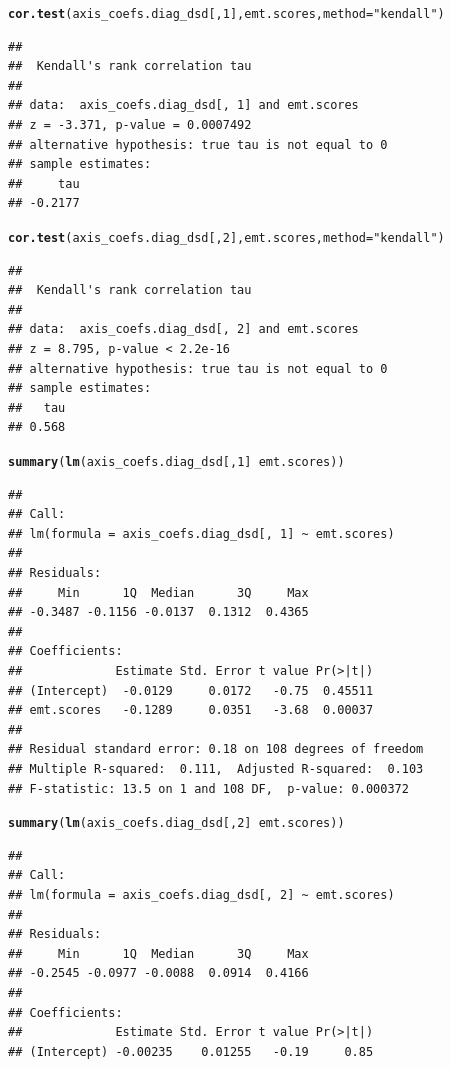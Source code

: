 \documentclass{article}\usepackage[]{graphicx}\usepackage[]{color}
\makeatletter
\newcommand{\hlnum}[1]{\textcolor[rgb]{0.686,0.059,0.569}{#1}}%
\newcommand{\hlstr}[1]{\textcolor[rgb]{0.192,0.494,0.8}{#1}}%
\newcommand{\hlopt}[1]{\textcolor[rgb]{0,0,0}{#1}}%
\newcommand{\hlstd}[1]{\textcolor[rgb]{0.345,0.345,0.345}{#1}}%
\newcommand{\hlkwc}[1]{\textcolor[rgb]{0.333,0.667,0.333}{#1}}%
\newcommand{\hlkwd}[1]{\textcolor[rgb]{0.737,0.353,0.396}{\textbf{#1}}}%
\newenvironment{kframe}{%
 \def\at@end@of@kframe{}%
 \ifinner\ifhmode%
  \def\at@end@of@kframe{\end{minipage}}%
  \begin{minipage}{\columnwidth}%
 \fi\fi%
 \def\FrameCommand##1{\hskip\@totalleftmargin \hskip-\fboxsep
 \colorbox{shadecolor}{##1}\hskip-\fboxsep
     \hskip-\linewidth \hskip-\@totalleftmargin \hskip\columnwidth}%
 \MakeFramed {\advance\hsize-\width
   \@totalleftmargin\z@ \linewidth\hsize
   \@setminipage}}%
 {\par\unskip\endMakeFramed%
 \at@end@of@kframe}
\newenvironment{knitrout}{}{} %
\makeatother
\begin{document}
\begin{knitrout}
\begin{kframe}\begin{alltt}
\hlkwd{cor.test}\hlstd{(axis_coefs.diag_dsd[,} \hlnum{1}\hlstd{], emt.scores,} \hlkwc{method} \hlstd{=} \hlstr{"kendall"}\hlstd{)}
\end{alltt}
\begin{verbatim}
## 
## 	Kendall's rank correlation tau
## 
## data:  axis_coefs.diag_dsd[, 1] and emt.scores
## z = -3.371, p-value = 0.0007492
## alternative hypothesis: true tau is not equal to 0
## sample estimates:
##     tau 
## -0.2177
\end{verbatim}
\begin{alltt}
\hlkwd{cor.test}\hlstd{(axis_coefs.diag_dsd[,} \hlnum{2}\hlstd{], emt.scores,} \hlkwc{method} \hlstd{=} \hlstr{"kendall"}\hlstd{)}
\end{alltt}
\begin{verbatim}
## 
## 	Kendall's rank correlation tau
## 
## data:  axis_coefs.diag_dsd[, 2] and emt.scores
## z = 8.795, p-value < 2.2e-16
## alternative hypothesis: true tau is not equal to 0
## sample estimates:
##   tau 
## 0.568
\end{verbatim}
\begin{alltt}
\hlkwd{summary}\hlstd{(}\hlkwd{lm}\hlstd{(axis_coefs.diag_dsd[,} \hlnum{1}\hlstd{]} \hlopt{~} \hlstd{emt.scores))}
\end{alltt}
\begin{verbatim}
## 
## Call:
## lm(formula = axis_coefs.diag_dsd[, 1] ~ emt.scores)
## 
## Residuals:
##     Min      1Q  Median      3Q     Max 
## -0.3487 -0.1156 -0.0137  0.1312  0.4365 
## 
## Coefficients:
##             Estimate Std. Error t value Pr(>|t|)
## (Intercept)  -0.0129     0.0172   -0.75  0.45511
## emt.scores   -0.1289     0.0351   -3.68  0.00037
## 
## Residual standard error: 0.18 on 108 degrees of freedom
## Multiple R-squared:  0.111,	Adjusted R-squared:  0.103 
## F-statistic: 13.5 on 1 and 108 DF,  p-value: 0.000372
\end{verbatim}
\begin{alltt}
\hlkwd{summary}\hlstd{(}\hlkwd{lm}\hlstd{(axis_coefs.diag_dsd[,} \hlnum{2}\hlstd{]} \hlopt{~} \hlstd{emt.scores))}
\end{alltt}
\begin{verbatim}
## 
## Call:
## lm(formula = axis_coefs.diag_dsd[, 2] ~ emt.scores)
## 
## Residuals:
##     Min      1Q  Median      3Q     Max 
## -0.2545 -0.0977 -0.0088  0.0914  0.4166 
## 
## Coefficients:
##             Estimate Std. Error t value Pr(>|t|)
## (Intercept) -0.00235    0.01255   -0.19     0.85

\end{verbatim}
\end{kframe}
\end{knitrout}
\end{document}
